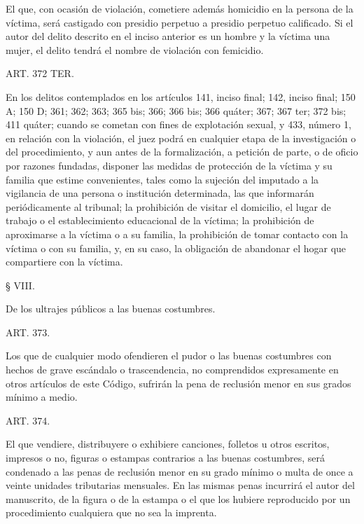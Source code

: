     El que, con ocasión de violación, cometiere además homicidio en la persona de la víctima, será castigado con presidio perpetuo a presidio perpetuo calificado.
    Si el autor del delito descrito en el inciso anterior es un hombre y la víctima una mujer, el delito tendrá el nombre de violación con femicidio.

    ART. 372 TER.

    En los delitos contemplados en los artículos 141, inciso final; 142, inciso final; 150 A; 150 D; 361; 362; 363; 365 bis; 366; 366 bis; 366 quáter; 367; 367 ter; 372 bis; 411 quáter; cuando se cometan con fines de explotación sexual, y 433, número 1, en relación con la violación, el juez podrá en cualquier etapa de la investigación o del procedimiento, y aun antes de la formalización, a petición de parte, o de oficio por razones fundadas, disponer las medidas de protección de la víctima y su familia que estime convenientes, tales como la sujeción del imputado a la vigilancia de una persona o institución determinada, las que informarán periódicamente al tribunal; la prohibición de visitar el domicilio, el lugar de trabajo o el establecimiento educacional de la víctima; la prohibición de aproximarse a la víctima o a su familia, la prohibición de tomar contacto con la víctima o con su familia, y, en su caso, la obligación de abandonar el hogar que compartiere con la víctima.
     


    § VIII.

    De los ultrajes públicos a las buenas costumbres.





    ART. 373.

    Los que de cualquier modo ofendieren el pudor o las buenas costumbres con hechos de grave escándalo o trascendencia, no comprendidos expresamente en otros artículos de este Código, sufrirán la pena de reclusión menor en sus grados mínimo a medio.


    ART. 374.

    El que vendiere, distribuyere o exhibiere canciones, folletos u otros escritos, impresos o no, figuras o estampas contrarios a las buenas costumbres, será condenado a las penas de reclusión menor en su grado mínimo o multa de once a veinte unidades tributarias mensuales.
    En las mismas penas incurrirá el autor del manuscrito, de la figura o de la estampa o el que los hubiere reproducido por un procedimiento cualquiera que no sea la imprenta.

